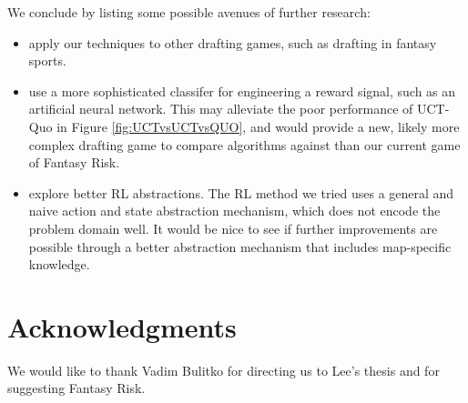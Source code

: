\documentclass[letterpaper]{article}
\numberwithin{equation}{section}
\numberwithin{theorem}{section}
\numberwithin{lemma}{section}
\numberwithin{df}{section}
\begin{document}
We conclude by listing some possible avenues of further research:
\begin{itemize} %
	\item apply our techniques to other drafting games, such as drafting in fantasy sports.  %
	\item use a more sophisticated classifer for engineering a reward signal, such as an artificial neural network.  This may alleviate the poor performance of UCT-Quo in Figure \ref{fig:UCTvsUCTvsQUO}, and would provide a new, likely more complex drafting game to compare algorithms against than our current game of Fantasy Risk.
	\item explore better RL abstractions.  The RL method we tried uses a general and naive action and state abstraction mechanism, which does not encode the problem domain well.  %
	It would be nice to see if further improvements are possible through a better abstraction mechanism that includes map-specific knowledge.
\end{itemize}

\section*{Acknowledgments}
We would like to thank Vadim Bulitko for directing us to Lee's thesis and for suggesting Fantasy Risk.  %

%
%


\end{document}
